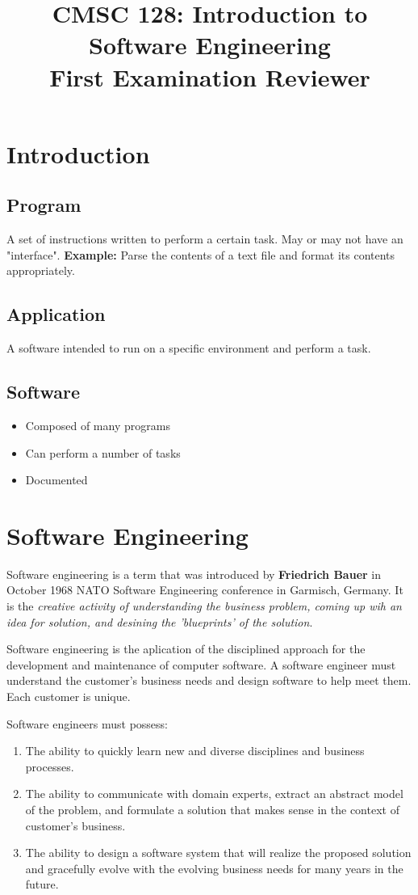 \documentclass[9pt,twocolumn]{article}
\title{
  \textbf{CMSC 128: Introduction to Software Engineering} \\
  First Examination Reviewer
}
\date{}
\begin{document}
\maketitle

\section*{Introduction}
  \subsection*{Program}
  A set of instructions written to perform a certain task. May or may not have an "interface". \textbf{Example:} Parse the contents of a text file and format its contents appropriately.

  \subsection*{Application}
  A software intended to run on a specific environment and perform a task.

  \subsection*{Software}
  \begin{itemize}
    \item Composed of many programs
    \item Can perform a number of tasks
    \item Documented
  \end{itemize}

\section*{Software Engineering}
  Software engineering is a term that was introduced by \textbf{Friedrich Bauer} in October 1968 NATO Software Engineering conference in Garmisch, Germany. It is the \emph{creative activity of understanding the business problem, coming up wih an idea for solution, and desining the 'blueprints' of the solution}.

  Software engineering is the aplication of the disciplined approach for the development and maintenance of computer software. A software engineer must understand the customer's business needs and design software to help meet them. Each customer is unique.

  Software engineers must possess:
  \begin{enumerate}
    \item The ability to quickly learn new and diverse disciplines and business processes.
    \item The ability to communicate with domain experts, extract an abstract model of the problem, and formulate a solution that makes sense in the context of customer's business.
    \item The ability to design a software system that will realize the proposed solution and gracefully evolve with the evolving business needs for many years in the future.
  \end{enumerate}
\end{document}
